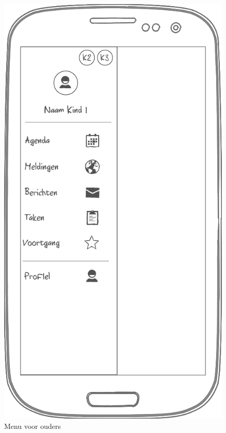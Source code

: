 \documentclass[a4paper]{article}
\begin{document}
\begin{appendices}
\newpage
\begin{figure}[H]
  \centerline{\includegraphics[width=\textwidth*4/5]{mobiel_ouder}}
  \caption{Menu voor ouders}
  \label{fig:mobiel_ouder}
\end{figure}


\end{appendices}
\end{document}
